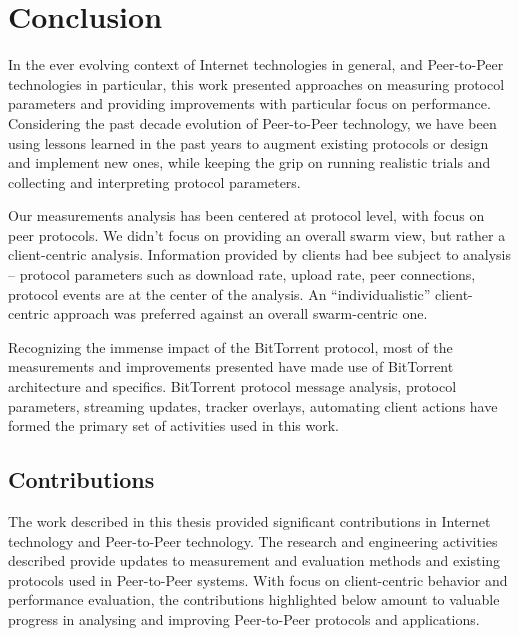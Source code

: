 
\chapter{Conclusion}
\label{chapter:conclusion}

In the ever evolving context of Internet technologies in general, and
Peer-to-Peer technologies in particular, this work presented approaches on
measuring protocol parameters and providing improvements with particular focus
on performance. Considering the past decade evolution of Peer-to-Peer
technology, we have been using lessons learned in the past years to augment
existing protocols or design and implement new ones, while keeping the grip on
running realistic trials and collecting and interpreting protocol parameters.

Our measurements analysis has been centered at protocol level, with focus on
peer protocols. We didn't focus on providing an overall swarm view, but rather
a client-centric analysis. Information provided by clients had bee subject to
analysis -- protocol parameters such as download rate, upload rate, peer
connections, protocol events are at the center of the analysis. An
``individualistic'' client-centric approach was preferred against an overall
swarm-centric one.

Recognizing the immense impact of the BitTorrent protocol, most of the
measurements and improvements presented have made use of BitTorrent
architecture and specifics. BitTorrent protocol message analysis, protocol
parameters, streaming updates, tracker overlays, automating client actions
have formed the primary set of activities used in this work.

\section{Contributions}
\label{sec:conclusion:contributions}

The work described in this thesis provided significant contributions in
Internet technology and Peer-to-Peer technology. The research and engineering
activities described provide updates to measurement and evaluation methods and
existing protocols used in Peer-to-Peer systems. With focus on client-centric
behavior and performance evaluation, the contributions highlighted below
amount to valuable progress in analysing and improving Peer-to-Peer protocols
and applications.

